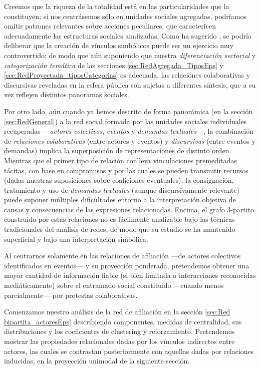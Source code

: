 \documentclass[letterpaper, 11pt]{book}
\theoremstyle{definition}
\theoremstyle{remark}
\begin{document}
Creemos que la riqueza de la totalidad está en las particularidades que la constituyen; si nos centrásemos sólo en unidades sociales agregadas, podríamos omitir patrones relevantes sobre acciones peculiares, que caractericen adecuadamente las estructuras sociales analizadas. 
Como ha sugerido \citet{2003_Diani_SocialNetworks}, se podría deliberar que la creación de vínculos simbólicos puede ser un ejercicio muy controvertido; de modo que aún suponiendo que nuestra \emph{diferenciación sectorial} y \emph{categorización temática} de las secciones \ref{sec:RedAgregada_TiposEps}  y \ref{sec:RedProyectada_tiposCategorias} es adecuada, las relaciones colaborativas y discursivas reveladas en la esfera pública son sujetas a diferentes síntesis, que a su vez reflejen distintos panoramas sociales. 

Por otro lado, aún cuando ya hemos descrito de forma panorámica (en la sección \ref{sec:RedGeneral}) a la red social formada por las unidades sociales individuales recuperadas ---\emph{actores colectivos}, \emph{eventos} y \emph{demandas textuales}---, la combinación de \emph{relaciones colaborativas} (entre actores y eventos) y \emph{discursivas} (entre eventos y demandas) implica la superposición de representaciones de distinto orden. 
Mientras que el primer tipo de relación conlleva vinculaciones premeditadas tácitas, con base en compromisos y por las cuales se pueden transmitir recursos (dadas nuestras suposiciones sobre coaliciones eventuales); la consignación, tratamiento y uso de \emph{demandas textuales} (aunque discursivamente relevante) puede suponer múltiples dificultades entorno a la interpretación objetiva de causas y consecuencias de las expresiones relacionadas. 
Encima, el grafo 3-partito construido por estas relaciones no es fácilmente analizable bajo las técnicas tradicionales del análisis de redes, de modo que su estudio se ha mantenido superficial y bajo una interpretación simbólica. 


Al centrarnos solamente en las relaciones de afiliación ---de actores colectivos identificados en eventos--- y su proyección ponderada, pretendemos obtener una mayor cantidad de información fiable (si bien limitada a interacciones reconocidas mediáticamente) sobre el entramado social constituido ---cuando menos parcialmente--- por protestas colaborativas. 


Comenzamos nuestro análisis de la red de afiliación en la sección \ref{sec:Red bipartita_actoresEps} describiendo componentes, medidas de centralidad, sus distribuciones y los coeficientes de clustering y reforzamiento. 
Pretendemos mostrar las propiedades relacionales dadas por los vínculos indirectos entre actores, las cuales se contrastan posteriormente con aquellas dadas por relaciones inducidas, en la proyección unimodal de la siguiente sección. 
\end{document}
